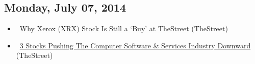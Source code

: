 \documentclass[11pt,asymmetric]{article}
\begin{document}
\subsection*{Monday, July 07, 2014}
\begin{itemize}
\item\ \href{http://www.thestreet.com/story/12766575/1/why-xerox-xrx-stock-is-still-a-buy-at-thestreet.html?puc=yahoo&cm_ven=YAHOO}{Why Xerox (XRX) Stock Is Still a `Buy' at TheStreet} (TheStreet)
\item\ \href{http://www.thestreet.com/story/12766289/1/3-stocks-pushing-the-computer-software-services-industry-downward.html?puc=yahoo&cm_ven=YAHOO}{3 Stocks Pushing The Computer Software \& Services Industry Downward} (TheStreet)
\end{itemize}
\end{document}
